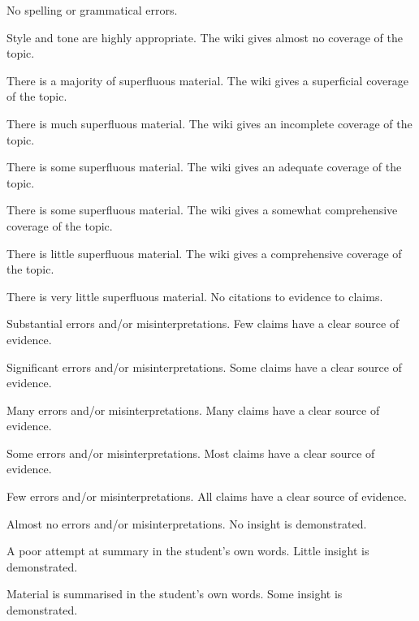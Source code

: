 \documentclass{../../fal_assignment}
\begin{document}
\begin{markingrubric}
       		\par 	No spelling or grammatical errors.
       		\par	Style and tone are highly appropriate.
%
        \grade\fail		The wiki gives almost no coverage of the topic.
				\par			There is a majority of superfluous material.
        \grade			The wiki gives a superficial coverage of the topic.
				\par			There is much superfluous material.
        \grade 		The wiki gives an incomplete coverage of the topic.
				\par			There is some superfluous material.
        \grade 		The wiki gives an adequate coverage of the topic.
				\par			There is some superfluous material.
        \grade 		The wiki gives a somewhat comprehensive coverage of the topic.
				\par			There is little superfluous material.
        \grade 		The wiki gives a comprehensive coverage of the topic.
				\par			There is very little superfluous material.
%
        \grade\fail 	No citations to evidence to claims.
        \par 		Substantial errors and/or misinterpretations.
        \grade 		Few claims have a clear source of evidence.
        \par 		Significant errors and/or misinterpretations.
        \grade 		Some claims have a clear source of evidence.
        \par 		Many errors and/or misinterpretations.
        \grade 		Many claims have a clear source of evidence.
        \par 		Some errors and/or misinterpretations.
        \grade 		Most claims have a clear source of evidence.
        \par 		Few errors and/or misinterpretations.
        \grade 		All claims have a clear source of evidence.
        \par 		Almost no errors and/or misinterpretations.
%
        \grade\fail No insight is demonstrated.
        \par		A poor attempt at summary in the student's own words.
        \grade		Little insight is demonstrated.
        \par		Material is summarised in the student's own words.
        \grade		Some insight is demonstrated.

\end{markingrubric}
\end{document}
